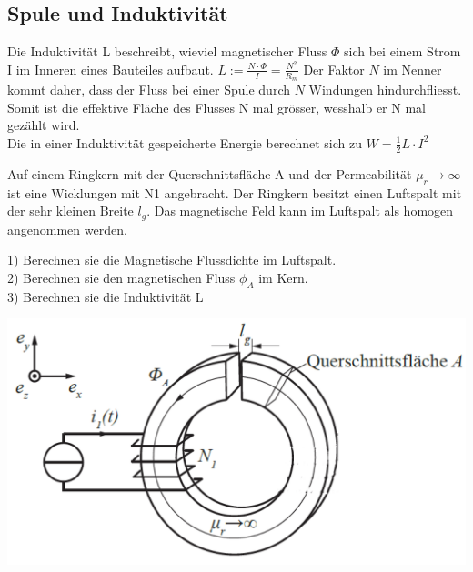 \newpage

\subsection{Spule und Induktivität}

\beginip
	Die Induktivität L beschreibt, wieviel magnetischer Fluss $\Phi$ sich bei einem Strom I im Inneren eines Bauteiles aufbaut.
	\formulaBegin
	$ L := \frac{N\cdot \Phi}{I} = \frac{N^2}{R_m} $
	\formulaEnd
	Der Faktor $N$ im Nenner kommt daher, dass der Fluss bei einer Spule durch $N$ Windungen hindurchfliesst. Somit ist die effektive Fläche des Flusses N mal grösser, wesshalb er N mal gezählt wird. \\

	Die in einer Induktivität gespeicherte Energie berechnet sich zu
	\formulaBegin
	$W =\displaystyle \frac{1}{2}L \cdot I^2$
	\formulaEnd
\iend



\beginbsp
Auf einem Ringkern mit der Querschnittsfläche A und der Permeabilität $\mu_r \rightarrow \infty$ ist
eine Wicklungen mit N1 angebracht. Der Ringkern
besitzt einen Luftspalt mit der sehr kleinen Breite $l_g$. Das magnetische Feld kann im
Luftspalt als homogen angenommen werden.

1) Berechnen sie die Magnetische Flussdichte im Luftspalt. \\
2) Berechnen sie den magnetischen Fluss $\phi_A$ im Kern.\\
3) Berechnen sie die Induktivität L
\begin{center}

\includegraphics[scale=0.25]{img/induktivitaet_bsp_1.png}

\end{center}

